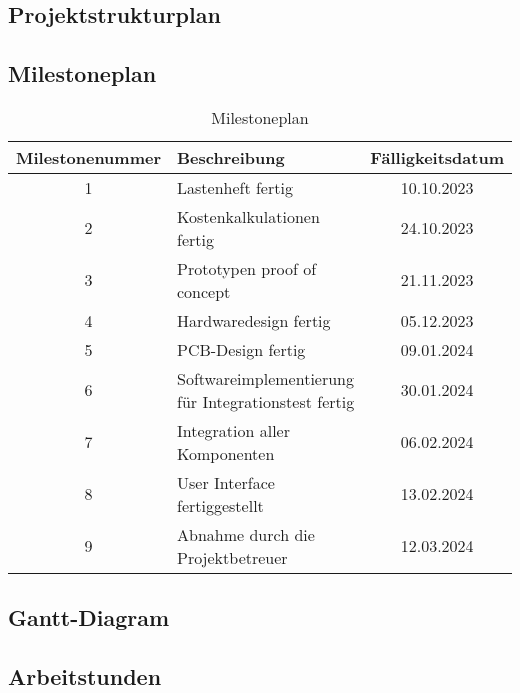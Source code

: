 \documentclass[titlepage,12pt,twoside]{article}
\begin{document}
\subsection{Projektstrukturplan}

\subsection{Milestoneplan}
\begin{table}[H]
    \centering
    \begin{tabular}{|c|l|c|}  %
        \hline
        \textbf{Milestonenummer} & \textbf{Beschreibung} & \textbf{Fälligkeitsdatum} \\
        \hline
        1 & Lastenheft fertig & 10.10.2023 \\
		\hline
        2 & Kostenkalkulationen fertig & 24.10.2023 \\
		\hline
        3 & Prototypen proof of concept & 21.11.2023 \\
		\hline
        4 & Hardwaredesign fertig & 05.12.2023 \\
		\hline
        5 & PCB-Design fertig & 09.01.2024 \\
		\hline
        6 & Softwareimplementierung für Integrationstest fertig & 30.01.2024 \\
		\hline
        7 & Integration aller Komponenten & 06.02.2024 \\
		\hline
        8 & User Interface fertiggestellt & 13.02.2024 \\
		\hline
        9 & Abnahme durch die Projektbetreuer & 12.03.2024 \\
        \hline
    \end{tabular}
    \caption{Milestoneplan}
    \label{tab:Milestoneplan}
\end{table}

\subsection{Gantt-Diagram}

\newpage
\subsection{Arbeitstunden}
\end{document}
